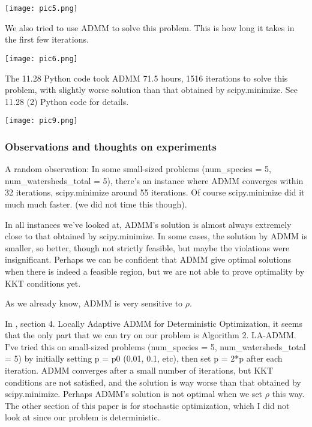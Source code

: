 \documentclass{article}
\begin{document}
\texttt{[image: pic5.png]}

We also tried to use ADMM to solve this problem. This is how long it takes in the first few iterations.

\texttt{[image: pic6.png]}

The 11.28 Python code took ADMM 71.5 hours, 1516 iterations to solve this problem, with slightly worse solution than that obtained by scipy.minimize. See 11.28 (2) Python code for details. 

\texttt{[image: pic9.png]}

\subsubsection{Observations and thoughts on experiments}

A random observation: In some small-sized problems (num\_species = 5, num\_watersheds\_total = 5), there's an instance where ADMM converges within 32 iterations, scipy.minimize around 55 iterations. Of course scipy.minimize did it much much faster. (we did not time this though). \newline

In all instances we've looked at, ADMM's solution is almost always extremely close to that obtained by scipy.minimize. In some cases, the solution by ADMM is smaller, so better, though not strictly feasible, but maybe the violations were insignificant. Perhaps we can be confident that ADMM give optimal solutions when there is indeed a feasible region, but we are not able to prove optimality by KKT conditions yet. \newline 

As we already know, ADMM is very sensitive to $\rho$. \newline

In \cite{Penalty Parameter}, section 4. Locally Adaptive ADMM for Deterministic Optimization, it seems that the only part that we can try on our problem is Algorithm 2. LA-ADMM. I've tried this on small-sized problems (num\_species = 5, num\_watersheds\_total = 5) by initially setting p = p0 (0.01, 0.1, etc), then set p = 2*p after each iteration. ADMM converges after a small number of iterations, but KKT conditions are not satisfied, and the solution is way worse than that obtained by scipy.minimize. Perhaps ADMM's solution is not optimal when we set $\rho$ this way. The other section of this paper is for stochastic optimization, which I did not look at since our problem is deterministic. \newline
\end{document}
